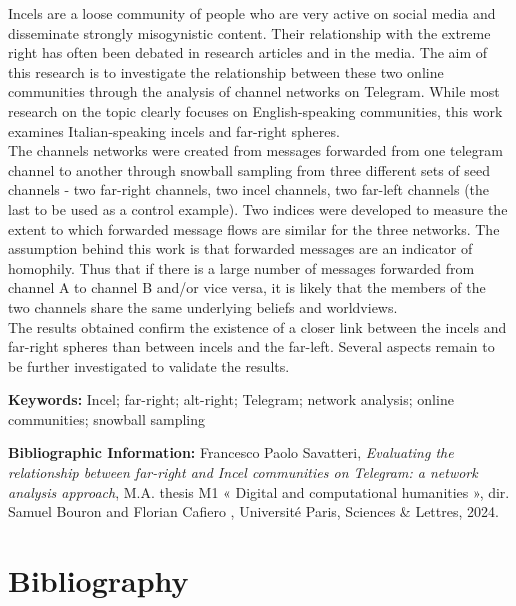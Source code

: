 \documentclass[a4paper,twoside,12pt, openany]{book}
\begin{document}
Incels are a loose community of people who are very active on social media and disseminate strongly misogynistic content. Their relationship with the extreme right has often been debated in research articles and in the media. The aim of this research is to investigate the relationship between these two online communities through the analysis of channel networks on Telegram. While most research on the topic clearly focuses on English-speaking communities, this work examines Italian-speaking incels and far-right spheres. \\

The channels networks were created from messages forwarded from one telegram channel to another through snowball sampling from three different sets of seed channels - two far-right channels, two incel channels, two far-left channels (the last to be used as a control example). Two indices were developed to measure the extent to which forwarded message flows are similar for the three networks. The assumption behind this work is that forwarded messages are an indicator of homophily. Thus that if there is a large number of messages forwarded from channel A to channel B and/or vice versa, it is likely that the members of the two channels share the same underlying beliefs and worldviews.\\

The results obtained confirm the existence of a closer link between the incels and far-right spheres than between incels and the far-left. Several aspects remain to be further investigated to validate the results.


\medskip

\textbf{Keywords:} Incel; far-right; alt-right; Telegram; network analysis; online communities; snowball sampling

\textbf{Bibliographic Information:} Francesco Paolo Savatteri, \textit{Evaluating the relationship between far-right and Incel communities on Telegram: a network analysis approach}, M.A. thesis M1 « Digital and computational humanities », dir. Samuel Bouron and Florian Cafiero , Université Paris, Sciences \& Lettres, 2024.


\clearpage
\thispagestyle{empty}
\cleardoublepage

\section*{Bibliography}
\printbibliography[heading=primary-source, keyword=primary-source]
\printbibliography[heading=secondary-source, keyword=secondary-source]
\end{document}
